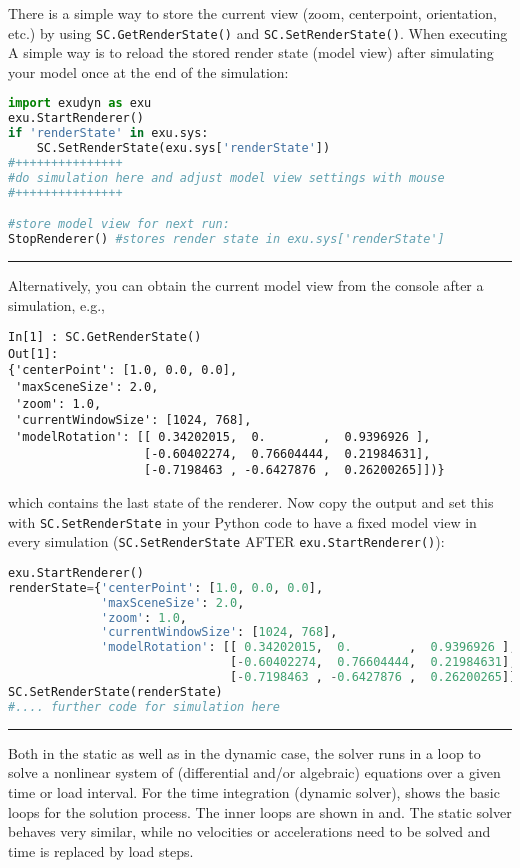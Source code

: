 \label{sec:storing:modelview}
There is a simple way to store the current view (zoom, centerpoint, orientation, etc.) by using \texttt{SC.GetRenderState()} and \texttt{SC.SetRenderState()}.
When executing 
A simple way is to reload the stored render state (model view) after simulating your model once at the end of the simulation:
\pythonstyle
\begin{lstlisting}[language=Python, firstnumber=1]
import exudyn as exu
exu.StartRenderer()
if 'renderState' in exu.sys:
    SC.SetRenderState(exu.sys['renderState']) 
#+++++++++++++++
#do simulation here and adjust model view settings with mouse
#+++++++++++++++

#store model view for next run:
StopRenderer() #stores render state in exu.sys['renderState']
\end{lstlisting}
\par\noindent\rule{\textwidth}{0.4pt}
%
Alternatively, you can obtain the current model view from the console after a simulation, e.g.,
\pythonstyle
\begin{lstlisting}
In[1] : SC.GetRenderState()
Out[1]: 
{'centerPoint': [1.0, 0.0, 0.0],
 'maxSceneSize': 2.0,
 'zoom': 1.0,
 'currentWindowSize': [1024, 768],
 'modelRotation': [[ 0.34202015,  0.        ,  0.9396926 ],
                   [-0.60402274,  0.76604444,  0.21984631],
                   [-0.7198463 , -0.6427876 ,  0.26200265]])}
\end{lstlisting}
%
which contains the last state of the renderer.
Now copy the output and set this with \texttt{SC.SetRenderState} in your Python code to have a fixed model view in every simulation (\texttt{SC.SetRenderState} AFTER \texttt{exu.StartRenderer()}):
\pythonstyle
\begin{lstlisting}[language=Python, firstnumber=1]
exu.StartRenderer()
renderState={'centerPoint': [1.0, 0.0, 0.0],
             'maxSceneSize': 2.0,
             'zoom': 1.0,
             'currentWindowSize': [1024, 768],
             'modelRotation': [[ 0.34202015,  0.        ,  0.9396926 ],
                               [-0.60402274,  0.76604444,  0.21984631],
                               [-0.7198463 , -0.6427876 ,  0.26200265]])
SC.SetRenderState(renderState)
#.... further code for simulation here
\end{lstlisting}
\par\noindent\rule{\textwidth}{0.4pt}
%
%
Both in the static as well as in the dynamic case, the solver runs in a loop to solve a nonlinear system of (differential and/or algebraic) equations over a given time or load interval.
For the time integration (dynamic solver),  shows the basic loops for the solution process. The inner loops are shown in  and.
The static solver behaves very similar, while no velocities or accelerations need to be solved and time is replaced by load steps.

